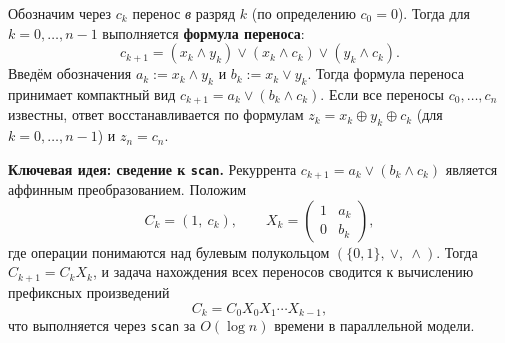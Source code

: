 Обозначим через $c_k$ перенос \emph{в} разряд $k$ (по определению $c_0 = 0$). Тогда для $k = 0, \dots, n-1$ выполняется \textbf{формула переноса}:
\[
c_{k+1} = (x_k \wedge y_k) \vee (x_k \wedge c_k) \vee (y_k \wedge c_k).
\]
Введём обозначения $a_k := x_k \wedge y_k$ и $b_k := x_k \vee y_k$. Тогда формула переноса принимает компактный вид $c_{k+1} = a_k \vee (b_k \wedge c_k)$. Если все переносы $c_0, \dots, c_n$ известны, ответ восстанавливается по формулам $z_k = x_k \oplus y_k \oplus c_k$ (для $k = 0, \dots, n-1$) и $z_n = c_n$.

\textbf{Ключевая идея: сведение к \texttt{scan}.}
Рекуррента $c_{k+1} = a_k \vee (b_k \wedge c_k)$ является аффинным преобразованием. Положим
\[
C_k = (1,\ c_k), \qquad
X_k = \begin{pmatrix} 1 & a_k \\ 0 & b_k \end{pmatrix},
\]
где операции понимаются над булевым полукольцом $(\{0,1\},\ \vee,\ \wedge)$. Тогда $C_{k+1} = C_k X_k$, и задача нахождения всех переносов сводится к вычислению префиксных произведений
\[
C_k = C_0 X_0 X_1 \cdots X_{k-1},
\]
что выполняется через \texttt{scan} за $O(\log n)$ времени в параллельной модели.

